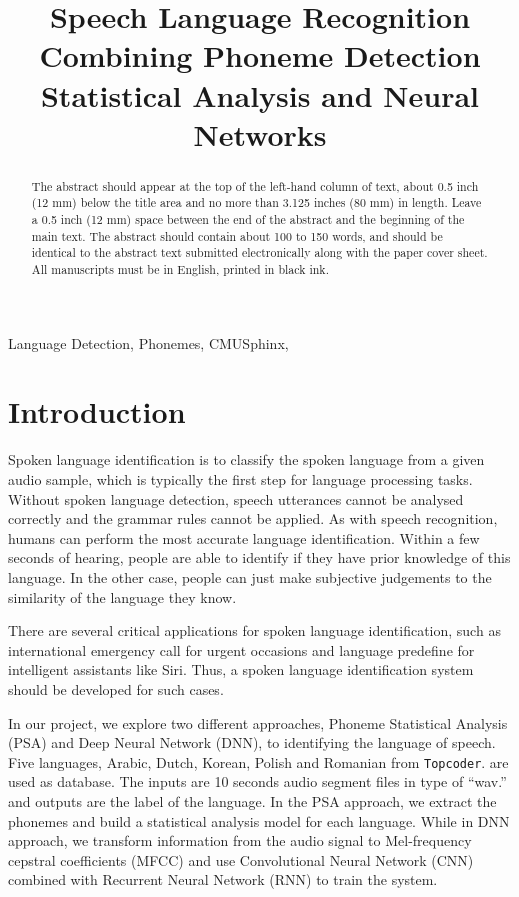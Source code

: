 \documentclass{article}
\title{Speech Language Recognition Combining Phoneme Detection Statistical Analysis and Neural Networks}
\begin{document}
%
\maketitle
%
\begin{abstract}
The abstract should appear at the top of the left-hand column of text, about
0.5 inch (12 mm) below the title area and no more than 3.125 inches (80 mm) in
length.  Leave a 0.5 inch (12 mm) space between the end of the abstract and the
beginning of the main text.  The abstract should contain about 100 to 150
words, and should be identical to the abstract text submitted electronically
along with the paper cover sheet.  All manuscripts must be in English, printed
in black ink.
\end{abstract}
%
\begin{keywords}
Language Detection, Phonemes, CMUSphinx,
\end{keywords}
%
\section{Introduction}
\label{sec:intro}

Spoken language identification is to classify the spoken language from a given audio sample, which is typically the first step for language processing tasks. Without spoken language detection, speech utterances cannot be analysed correctly and the grammar rules cannot be applied. As with speech recognition, humans can perform the most accurate language identification. Within a few seconds of hearing, people are able to identify if they have prior knowledge of this language. In the other case, people can just make subjective judgements to the similarity of the language they know.

There are several critical applications for spoken language identification, such as international emergency call for urgent occasions and language predefine for intelligent assistants like Siri. 
Thus, a spoken language identification system should be developed for such cases.

In our project, we explore two different approaches, Phoneme Statistical Analysis (PSA) and Deep Neural Network (DNN), to identifying the language of speech. Five languages, Arabic, Dutch, Korean, Polish and Romanian from \texttt{Topcoder}. are used as database. The inputs are 10  seconds audio segment files in type of “wav.” and outputs are the label of the language. In the PSA approach, we extract the phonemes and build a statistical analysis model for each language. While in DNN approach, we transform information from the audio signal to Mel-frequency cepstral coefficients (MFCC) and use Convolutional Neural Network (CNN) combined with Recurrent Neural Network (RNN) to train the system.
\end{document}
